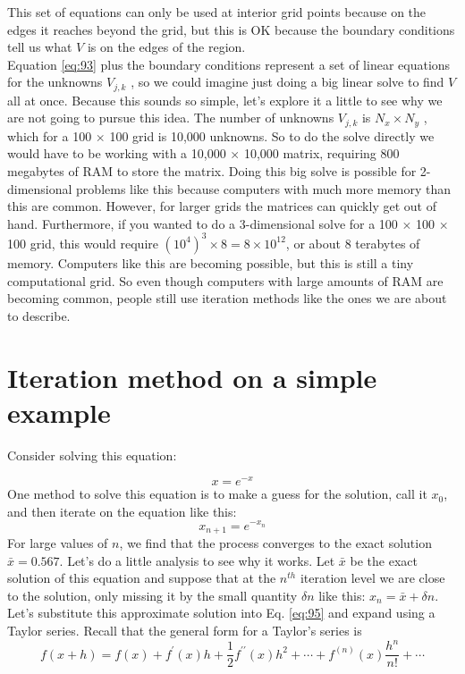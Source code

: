 This set of equations can only be used at interior grid points because on the edges
it reaches beyond the grid, but this is OK because the boundary conditions tell us
what $V$ is on the edges of the region.
\\
Equation \eqref{eq:93} plus the boundary conditions represent a set of linear equations for the unknowns $V_{j,k}$ , so we could imagine just doing a big linear solve to
find $V$ all at once. Because this sounds so simple, let\rq s explore it a little to see why
we are not going to pursue this idea. The number of unknowns $V_{j,k}$ is $N_x × N_y$ ,
which for a 100 $×$ 100 grid is 10,000 unknowns. So to do the solve directly we would
have to be working with a 10,000 $×$ 10,000 matrix, requiring 800 megabytes of RAM
to store the matrix. Doing this big solve is possible for 2-dimensional problems
like this because computers with much more memory than this are common.
However, for larger grids the matrices can quickly get out of hand. Furthermore,
if you wanted to do a 3-dimensional solve for a 100 $×$ 100 $×$ 100 grid, this would
require $(10^4)^3 × 8 = 8 × 10^{12}$, or about 8 terabytes of memory. Computers like this
are becoming possible, but this is still a tiny computational grid. So even though
computers with large amounts of RAM are becoming common, people still use
iteration methods like the ones we are about to describe.

\section*{Iteration method on a simple example}
Consider solving this equation:

\begin{equation}\label{eq:94}
x = e^{-x}
\end{equation}
One method to solve this equation is to make a guess for the solution, call it $x_0$,
and then iterate on the equation like this:
\begin{equation}\label{eq:95}
x_{n+1}=e^{-x_{n}}
\end{equation}
For large values of $n$, we find that the process converges to the exact solution
$ \bar{x} = 0.567$. Let\rq s do a little analysis to see why it works. Let $\bar{x}$ be the exact solution
of this equation and suppose that at the $n^{th}$ iteration level we are close to the
solution, only missing it by the small quantity $\delta n$ like this: $x_n = \bar{x} + \delta n$. Let\rq s
substitute this approximate solution into Eq. \eqref{eq:95} and expand using a Taylor
series. Recall that the general form for a Taylor\rq s series is
\begin{equation}\label{eq:96}
f(x+h)=f(x)+f^{\prime}(x) h+\frac{1}{2} f^{\prime \prime}(x) h^{2}+\cdots+f^{(n)}(x) \frac{h^{n}}{n !}+\cdots
\end{equation}

